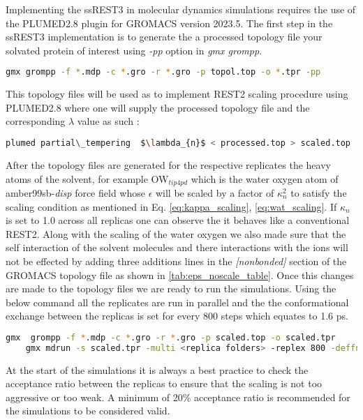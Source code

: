 
Implementing the ssREST3 in molecular dynamics simulations requires the use of the PLUMED2.8 plugin for GROMACS version 2023.5. 
The first step in the ssREST3 implementation is to generate the a processed topology file your solvated protein of interest using \textit{-pp} option in \textit{gmx grompp}.

\begin{lstlisting}[language=sh, basicstyle=\ttfamily\small]
    gmx grompp -f *.mdp -c *.gro -r *.gro -p topol.top -o *.tpr -pp
\end{lstlisting}

This topology files will be used as to implement REST2 scaling procedure using PLUMED2.8 where one will supply the processed topology file and the corresponding $\lambda$ value as such :

\begin{lstlisting}[language=sh, basicstyle=\ttfamily\small]
    plumed partial\_tempering  $\lambda_{n}$ < processed.top > scaled.top
\end{lstlisting}

After the topology files are generated for the respective replicates the heavy atoms 
of the solvent, for example OW$_{tip4pd}$ which is the water oxygen atom of amber99sb-\textit{disp} force field whose $\epsilon$ will be scaled by a factor of $\kappa^{2}_{n}$ to satisfy the scaling condition 
as mentioned in Eq. \ref{eq:kappa_scaling}, \ref{eq:wat_scaling}. 
If $\kappa_{n}$ is set to 1.0 across all replicas one can observe the it behaves like a conventional REST2. 
Along with the scaling of the water oxygen we also made sure that the self interaction of the solvent molecules and there interactions with the ions will not be effected by adding three additions lines in the \textit{[nonbonded]} section of the GROMACS topology file as shown in \ref{tab:eps_noscale_table}.
Once this changes are made to the topology files we are ready to run the simulations.
Using the below command all the replicates are run in parallel and the the conformational exchange between the replicas is set for every 800 steps which equates to 1.6 ps.

\begin{lstlisting}[language=sh, basicstyle=\ttfamily\small]
    gmx  grompp -f *.mdp -c *.gro -r *.gro -p scaled.top -o scaled.tpr
    gmx mdrun -s scaled.tpr -multi <replica folders> -replex 800 -deffnm replica -plumed plumed.dat
\end{lstlisting}


At the start of the simulations it is always a best practice to check the acceptance ratio between the replicas to ensure that the scaling is not too aggressive or too weak. 
A minimum of 20\% acceptance ratio is recommended for the simulations to be considered valid.